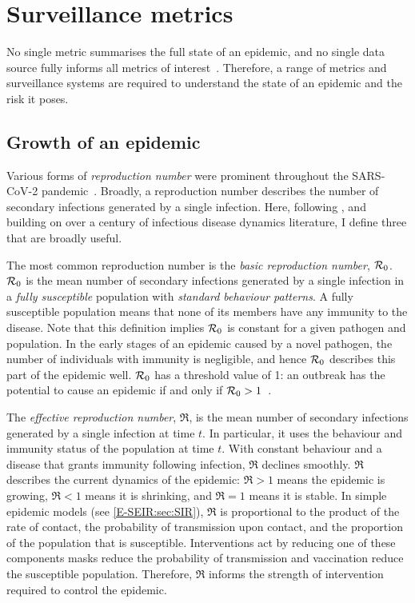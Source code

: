 \documentclass[thesis.tex]{subfiles}
\begin{document}
\section{Surveillance metrics} \label{intro:sec:metrics}

No single metric summarises the full state of an epidemic, and no single data source fully informs all metrics of interest~\autocite{royalSocietyRnumber,pellisEstimation,paragGrowthRates}.
Therefore, a range of metrics and surveillance systems are required to understand the state of an epidemic and the risk it poses.

\subsection{Growth of an epidemic}

Various forms of \emph{reproduction number} were prominent throughout the SARS-CoV-2 pandemic~\autocite{pellisEstimation}.
Broadly, a reproduction number describes the number of secondary infections generated by a single infection.
Here, following \textcite{pellisEstimation}, and building on over a century of infectious disease dynamics literature, I define three that are broadly useful.

The most common reproduction number is the \emph{basic reproduction number}, $\mathcal{R}_{0}$.
$\mathcal{R}_{0}$ is the mean number of secondary infections generated by a single infection in a \emph{fully susceptible} population with \emph{standard behaviour patterns}.
A fully susceptible population means that none of its members have any immunity to the disease.
Note that this definition implies $\mathcal{R}_{0}$ is constant for a given pathogen and population.
In the early stages of an epidemic caused by a novel pathogen, the number of individuals with immunity is negligible, and hence $\mathcal{R}_{0}$ describes this part of the epidemic well.
$\mathcal{R}_{0}$ has a threshold value of 1: an outbreak has the potential to cause an epidemic if and only if $\mathcal{R}_{0} > 1$~\autocite[76]{diekmannMathematical}.

The \emph{effective reproduction number}, $\Re$, is the mean number of secondary infections generated by a single infection at time $t$.
In particular, it uses the behaviour and immunity status of the population at time $t$.
With constant behaviour and a disease that grants immunity following infection, $\Re$ declines smoothly.
$\Re$ describes the current dynamics of the epidemic: $\Re > 1$ means the epidemic is growing, $\Re < 1$ means it is shrinking, and $\Re = 1$ means it is stable.
In simple epidemic models (see \cref{E-SEIR:sec:SIR}), $\Re$ is proportional to the product of the rate of contact, the probability of transmission upon contact, and the proportion of the population that is susceptible.
Interventions act by reducing one of these components \eg masks reduce the probability of transmission and vaccination reduce the susceptible population.
Therefore, $\Re$ informs the strength of intervention required to control the epidemic.
\end{document}

